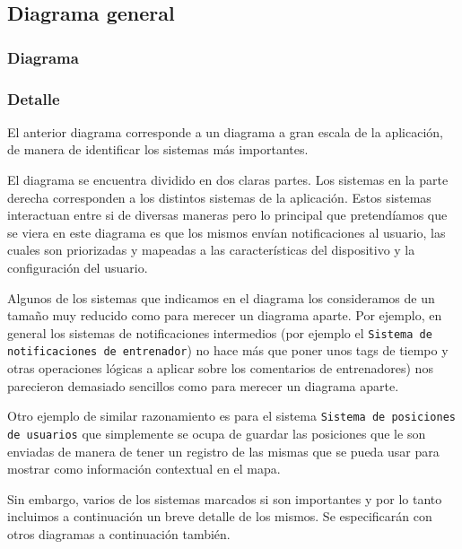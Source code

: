 \subsection{Diagrama general}
\subsubsection{Diagrama}

\subsubsection{Detalle}

El anterior diagrama corresponde a un diagrama a gran escala de la
aplicación, de manera de identificar los sistemas más importantes.

El diagrama se encuentra dividido en dos claras partes. Los sistemas
en la parte derecha corresponden a los distintos sistemas de la
aplicación. Estos sistemas interactuan entre si de diversas maneras pero lo 
principal que pretendíamos que se viera en este diagrama es que los mismos 
envían notificaciones al usuario, las cuales son priorizadas 
y mapeadas a las características del dispositivo y la configuración 
del usuario.

Algunos de los sistemas que indicamos en el diagrama los consideramos
de un tamaño muy reducido como para merecer un diagrama aparte. Por
ejemplo, en general los sistemas de notificaciones intermedios (por
ejemplo el \texttt{Sistema de notificaciones de entrenador}) no hace
más que poner unos tags de tiempo y otras operaciones lógicas a aplicar
sobre los comentarios de entrenadores) nos parecieron demasiado sencillos
como para merecer un diagrama aparte.

Otro ejemplo de similar razonamiento es para el sistema \texttt{Sistema de
posiciones de usuarios} que simplemente se ocupa de guardar las posiciones
que le son enviadas de manera de tener un registro de las mismas que se pueda
usar para mostrar como información contextual en el mapa.

Sin embargo, varios de los sistemas marcados si son importantes y por lo
tanto incluimos a continuación un breve detalle de los mismos. Se 
especificarán con otros diagramas a continuación también.

